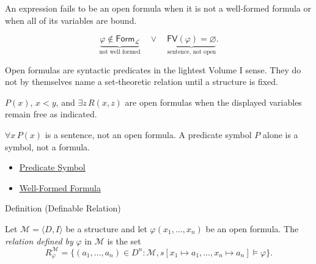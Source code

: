 \begin{remark*}
An expression fails to be an open formula when it is not a well-formed formula
or when all of its variables are bound.
\end{remark*}

\begin{remark*}
\[
\underbrace{\varphi\notin\mathsf{Form}_{\mathcal L}}_{\text{not well formed}}
\quad\lor\quad
\underbrace{\mathsf{FV}(\varphi)=\varnothing}_{\text{sentence, not open}}.
\]
\end{remark*}

\begin{remark*}[Interpretation]
Open formulas are syntactic predicates in the lightest Volume I sense. They do
not by themselves name a set-theoretic relation until a structure is fixed.
\end{remark*}

\begin{remark*}[Examples]
\(P(x)\), \(x<y\), and \(\exists z\,R(x,z)\) are open formulas when the
displayed variables remain free as indicated.
\end{remark*}

\begin{remark*}
\(\forall x\,P(x)\) is a sentence, not an open formula. A predicate symbol
\(P\) alone is a symbol, not a formula.
\end{remark*}

\begin{dependencies}
\begin{itemize}
  \item \hyperref[def:predicate-symbol]{Predicate Symbol}
  \item \hyperref[def:wff-pred]{Well-Formed Formula}
\end{itemize}
\end{dependencies}

\begin{definitionbox}{Definition (Definable Relation)}
\begin{definition}
\label{def:definable-relation}
Let \(\mathcal M=\langle D,I\rangle\) be a structure and let
\(\varphi(x_1,\ldots,x_n)\) be an open formula. The \emph{relation defined by}
\(\varphi\) in \(\mathcal M\) is the set
\[
R_{\varphi}^{\mathcal M}
=
\{(a_1,\ldots,a_n)\in D^n:
\mathcal M,s[x_1\mapsto a_1,\ldots,x_n\mapsto a_n]\models\varphi\}.
\]
\end{definition}
\end{definitionbox}

